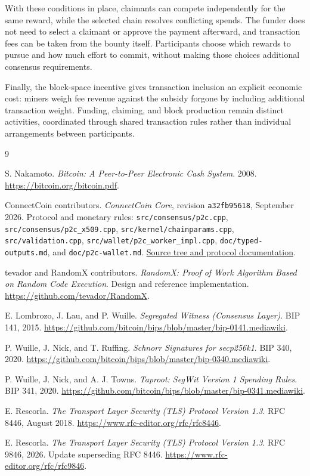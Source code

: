\documentclass[11pt,a4paper]{article}
\begin{document}
With these conditions in place, claimants can compete independently for the
same reward, while the selected chain resolves conflicting spends. The funder
does not need to select a claimant or approve the payment afterward, and
transaction fees can be taken from the bounty itself. Participants choose
which rewards to pursue and how much effort to commit, without making those
choices additional consensus requirements.

Finally, the block-space incentive gives transaction inclusion an explicit
economic cost: miners weigh fee revenue against the subsidy forgone by
including additional transaction weight. Funding, claiming, and block
production remain distinct activities, coordinated through shared transaction
rules rather than individual arrangements between participants.

\begin{thebibliography}{9}
\small\raggedright
{}
S. Nakamoto. \emph{Bitcoin: A Peer-to-Peer Electronic Cash System}. 2008.
\url{https://bitcoin.org/bitcoin.pdf}.

ConnectCoin contributors. \emph{ConnectCoin Core}, revision
\texttt{a32fb95618}, September 2026.
Protocol and monetary rules: \texttt{src/consensus/p2c.cpp},
\texttt{src/consensus/p2c\_x509.cpp}, \texttt{src/kernel/chainparams.cpp},
\texttt{src/validation.cpp}, \texttt{src/wallet/p2c\_worker\_impl.cpp},
\texttt{doc/typed-outputs.md}, and \texttt{doc/p2c-wallet.md}.
\href{https://github.com/connectcoincrypto/connectcoin/tree/a32fb95618f058a79125f1c5b98d95ad972445da}{Source tree and protocol documentation}.

tevador and RandomX contributors. \emph{RandomX: Proof of Work Algorithm
Based on Random Code Execution}. Design and reference implementation.
\url{https://github.com/tevador/RandomX}.

E. Lombrozo, J. Lau, and P. Wuille. \emph{Segregated Witness (Consensus Layer)}.
BIP 141, 2015. \url{https://github.com/bitcoin/bips/blob/master/bip-0141.mediawiki}.

P. Wuille, J. Nick, and T. Ruffing. \emph{Schnorr Signatures for secp256k1}.
BIP 340, 2020. \url{https://github.com/bitcoin/bips/blob/master/bip-0340.mediawiki}.

P. Wuille, J. Nick, and A. J. Towns. \emph{Taproot: SegWit Version 1
Spending Rules}. BIP 341, 2020.
\url{https://github.com/bitcoin/bips/blob/master/bip-0341.mediawiki}.

E. Rescorla. \emph{The Transport Layer Security (TLS) Protocol Version 1.3}.
RFC 8446, August 2018. \url{https://www.rfc-editor.org/rfc/rfc8446}.

E. Rescorla. \emph{The Transport Layer Security (TLS) Protocol Version 1.3}.
RFC 9846, 2026. Update superseding RFC 8446.
\url{https://www.rfc-editor.org/rfc/rfc9846}.

\end{thebibliography}
\end{document}
